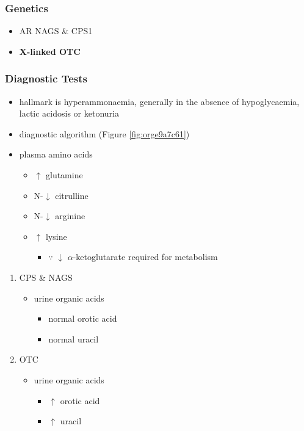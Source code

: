 \documentclass[12pt]{scrartcl}
\begin{document}
\begin{center}
\begin{center}
\subsubsection{Genetics}
\label{sec:org838be21}
\begin{itemize}
\item AR NAGS \& CPS1
\item \textbf{X-linked OTC}
\end{itemize}

\subsubsection{Diagnostic Tests}
\label{sec:orga8914da}
\begin{itemize}
\item hallmark is hyperammonaemia, generally in the absence of
hypoglycaemia, lactic acidosis or ketonuria
\item diagnostic algorithm (Figure \ref{fig:orge9a7c61})
\item plasma amino acids
\begin{itemize}
\item \(\uparrow\) glutamine
\item N-\(\downarrow\) citrulline
\item N-\(\downarrow\) arginine
\item \(\uparrow\) lysine
\begin{itemize}
\item \(\because\) \(\downarrow\) \(\alpha\)-ketoglutarate required for metabolism
\end{itemize}
\end{itemize}
\end{itemize}
\begin{enumerate}
\item CPS \& NAGS
\label{sec:orga013fbb}
\begin{itemize}
\item urine organic acids
\begin{itemize}
\item normal orotic acid
\item normal uracil
\end{itemize}
\end{itemize}
\item OTC
\label{sec:org4e1eb22}
\begin{itemize}
\item urine organic acids
\begin{itemize}
\item \(\uparrow\) orotic acid
\item \(\uparrow\) uracil
\end{itemize}
\end{itemize}
\end{enumerate}


\end{center}
\end{center}
\end{document}
